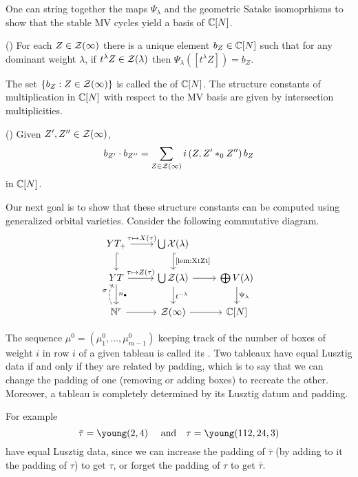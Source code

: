 \documentclass{article}
\begin{document}
One can string together the maps $\Psi_\lambda$ and the geometric Satake isomoprhisms to show that the stable MV cycles yield a basis of $\mathbb C[N]$.  

\begin{theorem}
(\cite[Proposition~6.1]{baumann2019mirkovic})
    For each $Z\in\mathcal Z(\infty)$ there is a unique element $b_Z\in\mathbb C[N]$ such that for any dominant weight $\lambda$, if $t^\lambda Z\in\mathcal Z(\lambda)$ then $\Psi_\lambda([t^\lambda Z]) = b_Z$.
\end{theorem}
% 
The set $ \{b_Z : Z \in \mathcal Z(\infty) \}$ is called the  of $ \mathbb C[N]$.  The structure constants of multiplication in $\mathbb C[N]$ with respect to the MV basis are given by intersection multiplicities. 
% 
\begin{theorem}
(\cite[Theorem~7.11]{baumann2019mirkovic}) 
    Given $Z',Z''\in\mathcal Z(\infty)$, 
\begin{equation}\label{eq:btimesb}
    b_{Z'}\cdot b_{Z''} = \sum_{Z\in\mathcal Z(\infty)} i\left(Z, Z' \ast_{0} Z''\right) b_Z 
\end{equation}
in $\mathbb C[N]$. 
\end{theorem}
Our next goal is to show that these structure constants can be computed using generalized orbital varieties. Consider the following commutative diagram.
\[
\begin{tikzcd}
    YT_+ \ar[r,"\tau\mapsto X(\tau)"]\ar[d,hook] & \bigcup \mathcal X(\lambda) \ar[d,hook,"\text{\Cref{lem:XtZt}}"] & \\
    YT      \ar[r,"\tau\mapsto Z(\tau)"] \ar[d,"n_\bullet"] & \bigcup\cZ(\lambda) \ar[r] \ar[d, "t^{-\lambda}"] & \bigoplus V(\lambda) \ar[d, "\Psi_\lambda"] \\ 
    \NN^{r} \ar[r] \ar[u,dashed,bend left,"\sigma"]         & \cZ(\infty) \ar[r]                                & \CC[N] 
\end{tikzcd}
\]

The sequence $\mu^0 = (\mu^0_1,\dots,\mu^0_{m-1})$ keeping track of the number of boxes of weight $i$ in row $i$ of a given tableau is called its . 
Two tableaux have equal Lusztig data if and only if they are related by padding, which is to say that we can change the padding of one (removing or adding boxes) to recreate the other. Moreover, a tableau is completely determined by its Lusztig datum and padding.

For example 
$$
    \bar \tau = \young(2,4) \quad \text{ and} \quad \tau = \young(112,24,3)
$$ 
have equal Lusztig data, since we can increase the padding of $\bar\tau$ (by adding to it the padding of $\tau$) to get $\tau$, or forget the padding of $\tau$ to get $\bar\tau$.
\end{document}
